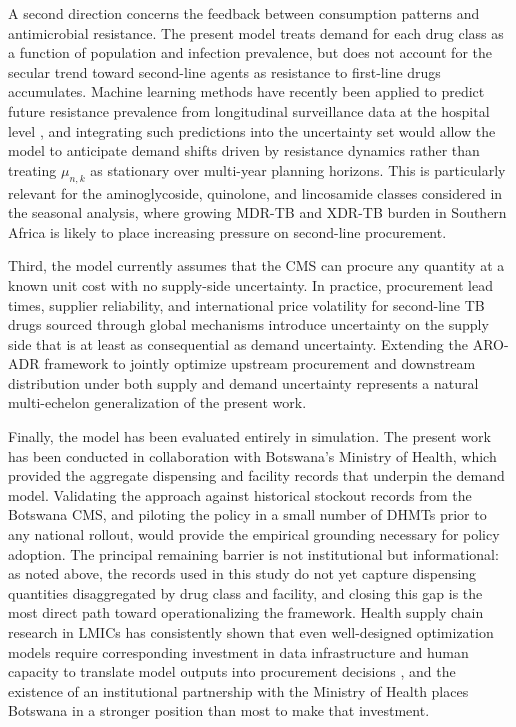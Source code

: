 \documentclass{article}
\begin{document}
A second direction concerns the feedback between consumption patterns and antimicrobial resistance. The present model treats demand for each drug class as a function of population and infection prevalence, but does not account for the secular trend toward second-line agents as resistance to first-line drugs accumulates. Machine learning methods have recently been applied to predict future resistance prevalence from longitudinal surveillance data at the hospital level \cite{vihta2024}, and integrating such predictions into the uncertainty set would allow the model to anticipate demand shifts driven by resistance dynamics rather than treating $\mu_{n,k}$ as stationary over multi-year planning horizons. This is particularly relevant for the aminoglycoside, quinolone, and lincosamide classes considered in the seasonal analysis, where growing MDR-TB and XDR-TB burden in Southern Africa is likely to place increasing pressure on second-line procurement.

Third, the model currently assumes that the CMS can procure any quantity at a known unit cost with no supply-side uncertainty. In practice, procurement lead times, supplier reliability, and international price volatility for second-line TB drugs sourced through global mechanisms introduce uncertainty on the supply side that is at least as consequential as demand uncertainty. Extending the ARO-ADR framework to jointly optimize upstream procurement and downstream distribution under both supply and demand uncertainty represents a natural multi-echelon generalization of the present work.

Finally, the model has been evaluated entirely in simulation. The present work has been conducted in collaboration with Botswana's Ministry of Health, which provided the aggregate dispensing and facility records that underpin the demand model. Validating the approach against historical stockout records from the Botswana CMS, and piloting the policy in a small number of DHMTs prior to any national rollout, would provide the empirical grounding necessary for policy adoption. The principal remaining barrier is not institutional but informational: as noted above, the records used in this study do not yet capture dispensing quantities disaggregated by drug class and facility, and closing this gap is the most direct path toward operationalizing the framework. Health supply chain research in LMICs has consistently shown that even well-designed optimization models require corresponding investment in data infrastructure and human capacity to translate model outputs into procurement decisions \cite{duwiejua2025}, and the existence of an institutional partnership with the Ministry of Health places Botswana in a stronger position than most to make that investment.
\end{document}
